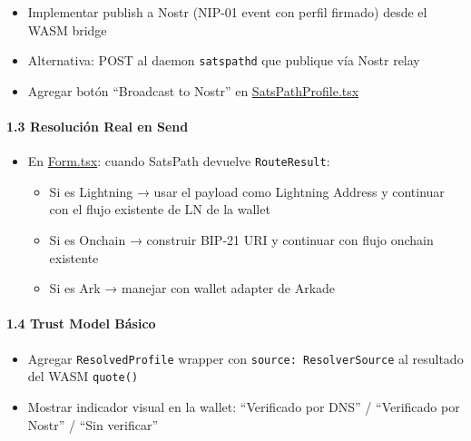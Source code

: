 \documentclass[
]{article}
\providecommand{\tightlist}{%
  \setlength{\itemsep}{0pt}\setlength{\parskip}{0pt}}
\begin{document}
\begin{itemize}
\tightlist
\item[$\square$]
  Implementar publish a Nostr (NIP-01 event con perfil firmado) desde el
  WASM bridge
\item[$\square$]
  Alternativa: POST al daemon \texttt{satspathd} que publique vía Nostr
  relay
\item[$\square$]
  Agregar botón ``Broadcast to Nostr'' en
  \href{file:///home/chelo/antigravity/PlanB/satspath/wallet/src/screens/Settings/SatsPathProfile.tsx}{SatsPathProfile.tsx}
\end{itemize}

\hypertarget{resoluciuxf3n-real-en-send}{%
\paragraph{1.3 Resolución Real en
Send}\label{resoluciuxf3n-real-en-send}}

\begin{itemize}
\tightlist
\item[$\square$]
  En
  \href{file:///home/chelo/antigravity/PlanB/satspath/wallet/src/screens/Wallet/Send/Form.tsx}{Form.tsx}:
  cuando SatsPath devuelve \texttt{RouteResult}:

  \begin{itemize}
  \tightlist
  \item
    Si es Lightning → usar el payload como Lightning Address y continuar
    con el flujo existente de LN de la wallet
  \item
    Si es Onchain → construir BIP-21 URI y continuar con flujo onchain
    existente
  \item
    Si es Ark → manejar con wallet adapter de Arkade
  \end{itemize}
\end{itemize}

\hypertarget{trust-model-buxe1sico}{%
\paragraph{1.4 Trust Model Básico}\label{trust-model-buxe1sico}}

\begin{itemize}
\tightlist
\item[$\square$]
  Agregar \texttt{ResolvedProfile} wrapper con
  \texttt{source:\ ResolverSource} al resultado del WASM
  \texttt{quote()}
\item[$\square$]
  Mostrar indicador visual en la wallet: ``Verificado por DNS'' /
  ``Verificado por Nostr'' / ``Sin verificar''
\end{itemize}
\end{document}
